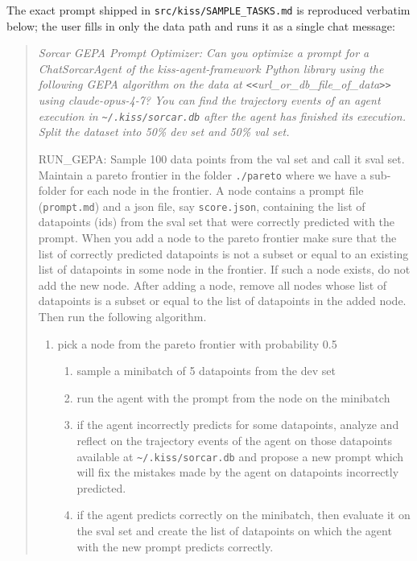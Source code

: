 \documentclass{article}
\begin{document}
The exact prompt shipped in \texttt{src/kiss/SAMPLE\_TASKS.md} is reproduced verbatim below; the user fills in only the data path and runs it as a single chat message:

\begin{quote}\small\itshape
Sorcar GEPA Prompt Optimizer: Can you optimize a prompt for a ChatSorcarAgent of the kiss-agent-framework Python library using the following GEPA algorithm on the data at \texttt{<\!<}url\_or\_db\_file\_of\_data\texttt{>\!>} using claude-opus-4-7?  You can find the trajectory events of an agent execution in \texttt{\textasciitilde/.kiss/sorcar.db} after the agent has finished its execution.  Split the dataset into 50\% dev set and 50\% val set.

\medskip

RUN\_GEPA: Sample 100 data points from the val set and call it sval set.  Maintain a pareto frontier in the folder \texttt{./pareto} where we have a sub-folder for each node in the frontier.  A node contains a prompt file (\texttt{prompt.md}) and a json file, say \texttt{score.json}, containing the list of datapoints (ids) from the sval set that were correctly predicted with the prompt.  When you add a node to the pareto frontier make sure that the list of correctly predicted datapoints is not a subset or equal to an existing list of datapoints in some node in the frontier.  If such a node exists, do not add the new node.  After adding a node, remove all nodes whose list of datapoints is a subset or equal to the list of datapoints in the added node.  Then run the following algorithm.
\begin{enumerate}
\item pick a node from the pareto frontier with probability 0.5
\begin{enumerate}
\item sample a minibatch of 5 datapoints from the dev set
\item run the agent with the prompt from the node on the minibatch
\item if the agent incorrectly predicts for some datapoints, analyze and reflect on the trajectory events of the agent on those datapoints available at \texttt{\textasciitilde/.kiss/sorcar.db} and propose a new prompt which will fix the mistakes made by the agent on datapoints incorrectly predicted.
\item if the agent predicts correctly on the minibatch, then evaluate it on the sval set and create the list of datapoints on which the agent with the new prompt predicts correctly.

\end{enumerate}
\end{enumerate}
\end{quote}
\end{document}
